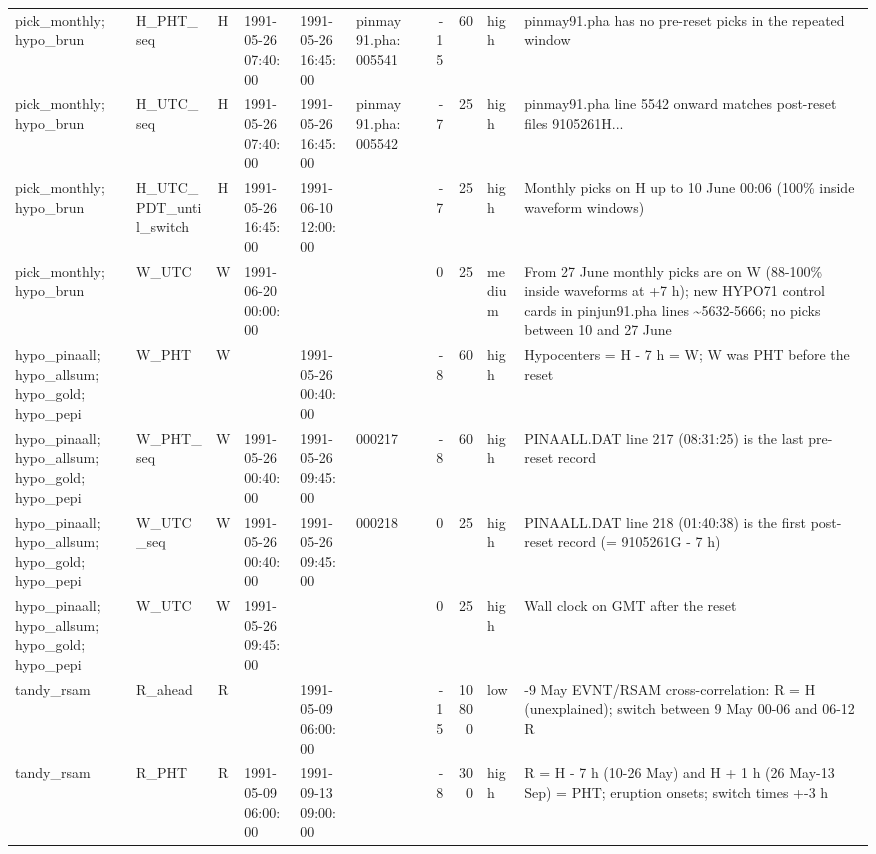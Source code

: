 \begin{landscape}
{\begin{longtable}{>{\raggedright}p{2.7cm}>{\raggedright}p{2.6cm}c>{\raggedright}p{1.6cm}>{\raggedright}p{1.6cm}>{\raggedright}p{2.9cm}rrrl>{\raggedright\arraybackslash}p{5.5cm}}
pick\_monthly; hypo\_brun & H\_\allowbreak{}PHT\_\allowbreak{}seq & H & 1991-05-26 07:40:00 & 1991-05-26 16:45:00 & pinmay91.pha:005541 &  & -15 & 60 & high & pinmay91.pha has no pre-reset picks in the repeated window\\
pick\_monthly; hypo\_brun & H\_\allowbreak{}UTC\_\allowbreak{}seq & H & 1991-05-26 07:40:00 & 1991-05-26 16:45:00 & pinmay91.pha:005542 &  & -7 & 25 & high & pinmay91.pha line 5542 onward matches post-reset files 9105261H...\\
pick\_monthly; hypo\_brun & H\_\allowbreak{}UTC\_\allowbreak{}PDT\_\allowbreak{}until\_\allowbreak{}switch & H & 1991-05-26 16:45:00 & 1991-06-10 12:00:00 &  &  & -7 & 25 & high & Monthly picks on H up to 10 June 00:06 (100\% inside waveform windows)\\
pick\_monthly; hypo\_brun & W\_\allowbreak{}UTC & W & 1991-06-20 00:00:00 &  &  &  & 0 & 25 & medium & From 27 June monthly picks are on W (88-100\% inside waveforms at +7 h); new HYPO71 control cards in pinjun91.pha lines \textasciitilde{}5632-5666; no picks between 10 and 27 June\\
hypo\_pinaall; hypo\_allsum; hypo\_gold; hypo\_pepi & W\_\allowbreak{}PHT & W &  & 1991-05-26 00:40:00 &  &  & -8 & 60 & high & Hypocenters = H - 7 h = W; W was PHT before the reset\\
hypo\_pinaall; hypo\_allsum; hypo\_gold; hypo\_pepi & W\_\allowbreak{}PHT\_\allowbreak{}seq & W & 1991-05-26 00:40:00 & 1991-05-26 09:45:00 & 000217 &  & -8 & 60 & high & PINAALL.DAT line 217 (08:31:25) is the last pre-reset record\\
hypo\_pinaall; hypo\_allsum; hypo\_gold; hypo\_pepi & W\_\allowbreak{}UTC\_\allowbreak{}seq & W & 1991-05-26 00:40:00 & 1991-05-26 09:45:00 & 000218 &  & 0 & 25 & high & PINAALL.DAT line 218 (01:40:38) is the first post-reset record (= 9105261G - 7 h)\\
hypo\_pinaall; hypo\_allsum; hypo\_gold; hypo\_pepi & W\_\allowbreak{}UTC & W & 1991-05-26 09:45:00 &  &  &  & 0 & 25 & high & Wall clock on GMT after the reset\\
tandy\_rsam & R\_\allowbreak{}ahead & R &  & 1991-05-09 06:00:00 &  &  & -15 & 10800 & low & 2-9 May EVNT/RSAM cross-correlation: R = H (unexplained); switch between 9 May 00-06 and 06-12 R\\
tandy\_rsam & R\_\allowbreak{}PHT & R & 1991-05-09 06:00:00 & 1991-09-13 09:00:00 &  &  & -8 & 300 & high & R = H - 7 h (10-26 May) and H + 1 h (26 May-13 Sep) = PHT; eruption onsets; switch times +-3 h\\

\end{longtable}}
\end{landscape}
